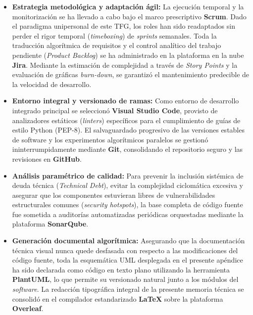 \begin{itemize}
    \item \textbf{Estrategia metodológica y adaptación ágil:} La ejecución temporal y la monitorización se ha llevado a cabo bajo el marco prescriptivo \textbf{Scrum}. Dado el paradigma unipersonal de este TFG, los roles han sido readaptados sin perder el rigor temporal (\textit{timeboxing}) de \textit{sprints} semanales. Toda la traducción algorítmica de requisitos y el control analítico del trabajo pendiente (\textit{Product Backlog}) se ha administrado en la plataforma en la nube \textbf{Jira}. Mediante la estimación de complejidad a través de \textit{Story Points} y la evaluación de gráficas \textit{burn-down}, se garantizó el mantenimiento predecible de la velocidad de desarrollo.
    
    \item \textbf{Entorno integral y versionado de ramas:} Como entorno de desarrollo integrado principal se seleccionó \textbf{Visual Studio Code}, provisto de analizadores estáticos (\textit{linters}) específicos para el cumplimiento de guías de estilo Python (PEP-8). El salvaguardado progresivo de las versiones estables de software y los experimentos algorítmicos paralelos se gestionó ininterrumpidamente mediante \textbf{Git}, consolidando el repositorio seguro y las revisiones en \textbf{GitHub}.
    
    \item \textbf{Análisis paramétrico de calidad:} Para prevenir la inclusión sistémica de deuda técnica (\textit{Technical Debt}), evitar la complejidad ciclomática excesiva y asegurar que los componentes estuvieran libres de vulnerabilidades estructurales comunes (\textit{security hotspots}), la base completa de código fuente fue sometida a auditorías automatizadas periódicas orquestadas mediante la plataforma \textbf{SonarQube}.
    
    \item \textbf{Generación documental algorítmica:} Asegurando que la documentación técnica visual nunca quede desfasada con respecto a las modificaciones del código fuente, toda la esquemática UML desplegada en el presente apéndice ha sido declarada como código en texto plano utilizando la herramienta \textbf{PlantUML}, lo que permite su versionado natural junto a los módulos del \textit{software}. La redacción tipográfica integral de la presente memoria técnica se consolidó en el compilador estandarizado \textbf{LaTeX} sobre la plataforma \textbf{Overleaf}.
    

\end{itemize}

